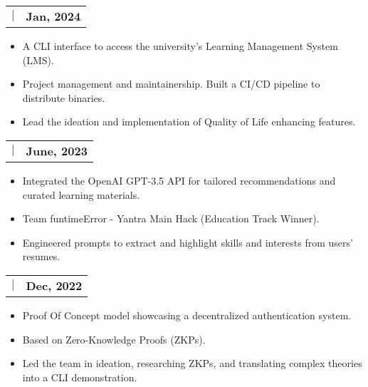 \documentclass[letterpaper,11pt]{article}
\makeatletter
\newcommand{\uniformunderline}[1]{%
  \uline{\phantom{#1}}%
  \llap{\contour{white}{#1}}%
}
\newcommand{\resumeItem}[1]{
  \item\small{
    {#1 \vspace{-2pt}}
  }
}
\newcommand{\resumeProjectHeading}[2]{
    \item
    \begin{tabular*}{1.001\textwidth}{l@{\extracolsep{\fill}}r}
      \small#1 & \textbf{\small #2}\\
    \end{tabular*}\vspace{-7pt}
}
\newcommand{\resumeItemListStart}{\begin{itemize}}
\newcommand{\resumeItemListEnd}{\end{itemize}\vspace{-5pt}}
\makeatother
\begin{document}
      \resumeProjectHeading
          {\href{https://cli-top.acmvit.in}{\textbf{\large{\uniformunderline{CLI - Top}}} \href{https://cli-top.acmvit.in}{\raisebox{-0.1\height}\faExternalLink }} $|$ \normalsize{\href{https://github.com/ACM-VIT/cli-top}{\uniformunderline{Go, Cobra, Glamour}}}}{Jan, 2024}
          \vspace{-11pt}
          \resumeItemListStart
            \resumeItem{\normalsize{A CLI interface to access the university's Learning Management System (LMS).}} 
            \resumeItem{\normalsize{Project management and maintainership. Built a CI/CD pipeline to distribute binaries.}} 
            \resumeItem{\normalsize{Lead the ideation and implementation of Quality of Life enhancing features.}}
          \resumeItemListEnd
          \vspace{-15pt}
          
       \resumeProjectHeading
          {\href{https://github.com/kaushalrathi24/funtimeError}{\textbf{\large{\uniformunderline{Career Node}}} \href{https://github.com/kaushalrathi24/funtimeError}{\raisebox{-0.1\height}\faExternalLink }} $|$ \normalsize{\uniformunderline{ChatGPT 3.5, TypeScript, Flask}}}{June, 2023}
          \vspace{-11pt}
          \resumeItemListStart
            \resumeItem{\normalsize{Integrated the OpenAI GPT-3.5 API for tailored recommendations and curated learning materials.}} 
            \resumeItem{\normalsize{Team funtimeError - Yantra Main Hack (Education Track Winner).}} \vspace{-0.1pt}
            \resumeItem{\normalsize{Engineered prompts to extract and highlight skills and interests from users' resumes.}} 
          \resumeItemListEnd 
          \vspace{-15pt}
          
      \resumeProjectHeading
          {\href{https://github.com/ACM-VIT/accessDenied}{\textbf{\large{\uniformunderline{Access Denied}}} \href{https://github.com/ACM-VIT/accessDenied}{\raisebox{-0.1\height}\faExternalLink }} $|$ \normalsize{\uniformunderline{Python, JavaScript, \href{https://colab.research.google.com/drive/1oTl9P42TniMFApstGZ4R4WLa_jZR1WrS}{\textbf{Jupyter Notebook}}} {\raisebox{-0.1\height}\faExternalLink}}}{Dec, 2022}
          \vspace{-11pt}
          \resumeItemListStart
            \resumeItem{\normalsize{Proof Of Concept model showcasing a decentralized authentication system.}} 
            \resumeItem{\normalsize{Based on Zero-Knowledge Proofs (ZKPs).}} 
            \resumeItem{\normalsize{Led the team in ideation, researching ZKPs, and translating complex theories into a CLI demonstration.}}
          \resumeItemListEnd
\end{document}
